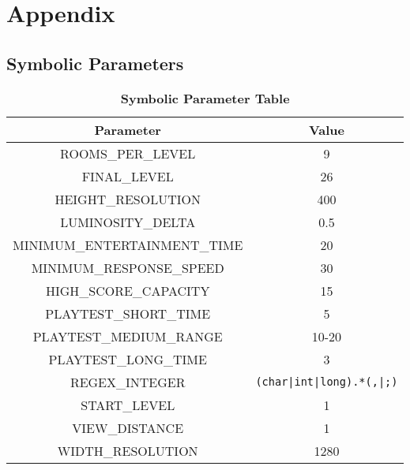 \documentclass[12pt, titlepage]{article}
\begin{document}
\newpage





\newpage
\section{Appendix}
\label{section7}

	\subsection{Symbolic Parameters}

		\begin{table}[h!]
			\centering
			\caption{\textbf{Symbolic Parameter Table}}
			\label{symbolicParameters}
			\bigskip
			\def\arraystretch{1.6}


			\begin{tabular}{| c | c |}
				\bottomrule
				\textbf{Parameter} & \textbf{Value} \\
				\hline
				ROOMS\_PER\_LEVEL & 9 \\
				FINAL\_LEVEL & 26 \\
				HEIGHT\_RESOLUTION & 400 \\
				LUMINOSITY\_DELTA & 0.5 \\
				MINIMUM\_ENTERTAINMENT\_TIME & 20 \\
				MINIMUM\_RESPONSE\_SPEED & 30 \\
				HIGH\_SCORE\_CAPACITY & 15 \\
				PLAYTEST\_SHORT\_TIME & 5 \\
				PLAYTEST\_MEDIUM\_RANGE & 10-20 \\
				PLAYTEST\_LONG\_TIME & 3 \\
				REGEX\_INTEGER & \lstinline$(char|int|long).*(,|;)$ \\
				START\_LEVEL & 1 \\
				VIEW\_DISTANCE & 1 \\
				WIDTH\_RESOLUTION & 1280 \\
				\toprule
			\end{tabular}
		\end{table}

\newpage
\end{document}
